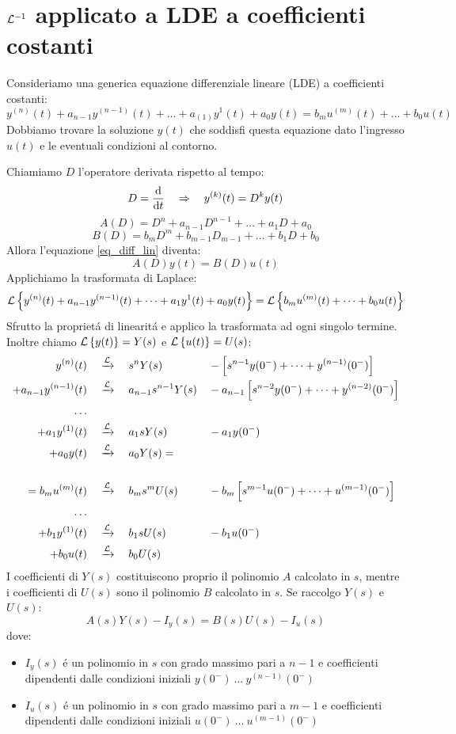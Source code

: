 \documentclass[../main.tex]{subfiles}
\begin{document}
	\section{$\mathcal{L}^{-1}$ applicato a LDE a coefficienti costanti}
		Consideriamo una generica equazione differenziale lineare (LDE) a coefficienti costanti:
		\begin{equation} \label{eq_diff_lin}
			y^{(n)}(t) + a_{n-1}y^{(n-1)}(t) + \dots + a_{(1)}y^{1}(t) + a_{0}y(t) = b_{m}u^{(m)}(t) + \dots + b_0 u(t)
		\end{equation}
		Dobbiamo trovare la soluzione $ y(t) $ che soddisfi questa equazione dato l'ingresso $ u(t) $ e le eventuali condizioni al contorno.
		
		Chiamiamo $ D $ l'operatore derivata rispetto al tempo:
		\[
			D = \frac{\mathrm{d} }{\mathrm{d} t} \quad \Rightarrow \quad y^{(k)}(t) = D^k y(t)
		\]
		\[
			A(D) = D^n + a_{n-1} D^{n-1} + \dots + a_1 D + a_0
		\]
		\[
			B(D) = b_m D^m + b_{m-1} D_{m-1} + \dots + b_1 D + b_0
		\]
		Allora l'equazione \ref{eq_diff_lin} diventa:
		\[
			A(D) y(t) = B(D) u(t)
		\]
		Applichiamo la trasformata di Laplace:
		\[
			\mathcal{L} \left\lbrace y^{(n)}(t) + a_{n-1}y^{(n-1)}(t) + \dots + a_{1}y^{1}(t) + a_{0}y(t) \right\rbrace = \mathcal{L} \left\lbrace b_{m}u^{(m)}(t) + \dots + b_0 u(t) \right\rbrace
		\]
		Sfrutto la propriet\'{a} di linearit\'{a} e applico la trasformata ad ogni singolo termine. Inoltre chiamo $ \mathcal{L} \left\lbrace y(t) \right\rbrace = Y(s) $ e $ \mathcal{L} \left\lbrace u(t) \right\rbrace = U(s) $:
		\begin{align*}
			\Lapl{y^{(n)}(t)&}{s^n Y(s) &&- \left[ s^{n-1} y(0^-) + \dots + y^{(n-1)}(0^-) \right] }
			\\
			\Lapl{+ a_{n-1}y^{(n-1)}(t)&}{a_{n-1} s^{n-1} Y(s) &&- a_{n-1} \left[ s^{n-2} y(0^-) + \dots + y^{(n-2)}(0^-) \right] }
			\\
			\smallskip\dots\smallskip
			\\
			\Lapl{+ a_{1}y^{(1)}(t)&}{a_{1} s Y(s) &&- a_{1} y(0^-) }
			\\
			\Lapl{+ a_{0}y(t)&}{a_{0} Y(s) } =
			\\\medskip
			\\
			\Lapl{ = b_m u^{(m)}(t)& }{b_m s^m U(s) &&- b_m \left[ s^{m-1} u(0^-) + \dots + u^{(m-1)}(0^-) \right] }
			\\
			\smallskip\dots\smallskip
			\\
			\Lapl{+ b_{1}y^{(1)}(t)&}{b_{1} s U(s) &&- b_{1} u(0^-) }
			\\
			\Lapl{+ b_{0}u(t)&}{b_{0} U(s) }
		\end{align*}
		I coefficienti di $ Y(s) $ costituiscono proprio il polinomio $ A $ calcolato in $ s $, mentre i coefficienti di $ U(s) $ sono il polinomio $ B $ calcolato in $ s $. Se raccolgo $ Y(s) $ e $ U(s) $:
		\[
			A(s) Y(s) - I_y(s) = B(s) U(s) - I_u(s)
		\]
		dove:
		\begin{itemize}
			\item
				$ I_y(s) $ \'{e} un polinomio in $ s $ con grado massimo pari a $ n-1 $ e coefficienti dipendenti dalle condizioni iniziali $ y(0^-)\ \dots\ y^{(n-1)}(0^-) $
			\item
				$ I_u(s) $ \'{e} un polinomio in $ s $ con grado massimo pari a $ m-1 $ e coefficienti dipendenti dalle condizioni iniziali $ u(0^-)\ \dots\ u^{(m-1)}(0^-) $
		\end{itemize}
	
\end{document}

